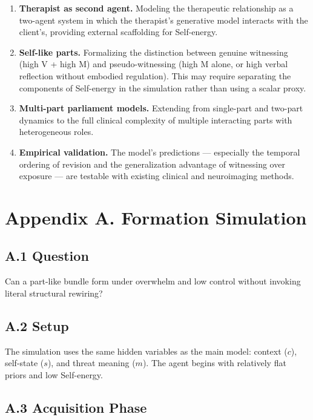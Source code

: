 \documentclass[11pt]{article}
\begin{document}
\begin{enumerate}
\def\labelenumi{\arabic{enumi}.}
\item
  \textbf{Therapist as second agent.} Modeling the therapeutic
  relationship as a two-agent system in which the therapist's generative
  model interacts with the client's, providing external scaffolding for
  Self-energy.
\item
  \textbf{Self-like parts.} Formalizing the distinction between genuine
  witnessing (high V + high M) and pseudo-witnessing (high M alone, or
  high verbal reflection without embodied regulation). This may require
  separating the components of Self-energy in the simulation rather than
  using a scalar proxy.
\item
  \textbf{Multi-part parliament models.} Extending from single-part and
  two-part dynamics to the full clinical complexity of multiple
  interacting parts with heterogeneous roles.
\item
  \textbf{Empirical validation.} The model's predictions --- especially
  the temporal ordering of revision and the generalization advantage of
  witnessing over exposure --- are testable with existing clinical and
  neuroimaging methods.
\end{enumerate}

\section{Appendix A. Formation
Simulation}\label{appendix-a.-formation-simulation}

\subsection{A.1 Question}\label{a.1-question}

Can a part-like bundle form under overwhelm and low control without
invoking literal structural rewiring?

\subsection{A.2 Setup}\label{a.2-setup}

The simulation uses the same hidden variables as the main model: context
(\(c\)), self-state (\(s\)), and threat meaning (\(m\)). The agent
begins with relatively flat priors and low Self-energy.

\subsection{A.3 Acquisition Phase}\label{a.3-acquisition-phase}
\end{document}

